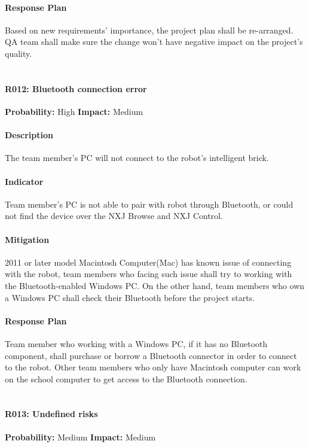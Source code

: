 \documentclass[11pt, a4paper]{report}
\begin{document}
	\paragraph{Response Plan}Based on new requirements' importance, the project plan shall be re-arranged. QA team shall make sure the change won't have negative impact on the project's quality. \\\\


	\paragraph{R012: Bluetooth connection error} \hspace{1cm} \textbf{Probability: }High\hspace{1cm}   \textbf{Impact: }Medium
	\paragraph{Description}The team member's PC will not connect to the robot's intelligent brick.
	\paragraph{Indicator}Team member's PC is not able to pair with robot through Bluetooth, or could not find the device over the NXJ Browse and NXJ Control. 
	\paragraph{Mitigation}2011 or later model Macintosh Computer(Mac) has known issue of connecting with the robot, team members who facing such issue shall try to working with the Bluetooth-enabled Windows PC. On the other hand, team members who own a Windows PC shall check their Bluetooth before the project starts. 
	\paragraph{Response Plan}Team member who working with a Windows PC, if it has no Bluetooth component, shall purchase or borrow a Bluetooth connector in order to connect to the robot. Other team members who only have Macintosh computer can work on the school computer to get access to the Bluetooth connection.\\\\


	\paragraph{R013: Undefined risks} \hspace{1cm} \textbf{Probability: }Medium\hspace{1cm}   \textbf{Impact: }Medium
\end{document}
